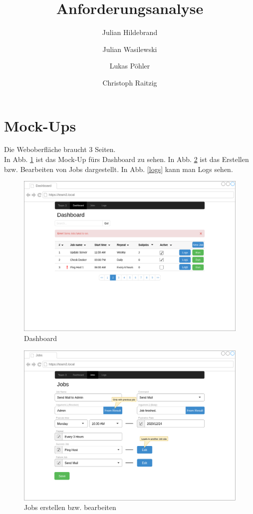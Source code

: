 \documentclass[a4paper,10pt]{article}
\title{Anforderungsanalyse}
\author{Julian Hildebrand\and{}Julian Wasilewski\and{}Lukas Pöhler\and{}Christoph Raitzig}
\begin{document}
\maketitle

\tableofcontents

\newpage

\section{Mock-Ups}
Die Weboberfläche braucht 3 Seiten.\\
In Abb. \ref{dashboard} ist das Mock-Up fürs Dashboard zu sehen. In Abb. \ref{jobs} ist das Erstellen bzw. Bearbeiten von Jobs dargestellt. In Abb. \ref{logs} kann man Logs sehen.
\begin{figure}[!htb]
	\centering
	\includegraphics[width=\textwidth]{../Mock-Ups/mockup-dashboard}
	\caption{Dashboard}
	\label{dashboard}
\end{figure}
\begin{figure}[!htb]
	\centering
	\includegraphics[width=\textwidth]{../Mock-Ups/mockup-jobs}
	\caption{Jobs erstellen bzw. bearbeiten}
	\label{jobs}
\end{figure}
\end{document}
